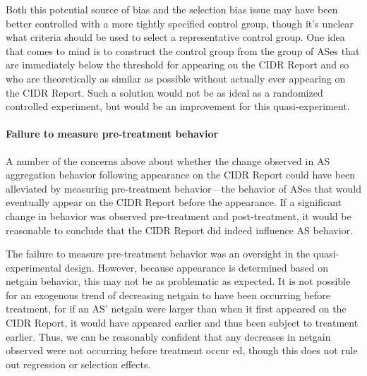 Both this potential source of bias and the selection bias issue may have been
better controlled with a more tightly specified control group, though it's
unclear what criteria should be used to select a representative control group.
One idea that comes to mind is to construct the control group from the group of
ASes that are immediately below the threshold for appearing on the CIDR Report
and so who are theoretically as similar as possible without actually ever
appearing on the CIDR Report. Such a solution would not be as ideal as a
randomized controlled experiment, but would be an improvement for this
quasi-experiment.


\paragraph{Failure to measure pre-treatment behavior}
A number of the concerns above about whether the change observed in AS
aggregation behavior following appearance on the CIDR Report could have been
alleviated by measuring pre-treatment behavior---the behavior of ASes that would
eventually appear on the CIDR Report before the appearance. If a significant
change in behavior was observed pre-treatment and post-treatment, it would be
reasonable to conclude that the CIDR Report did indeed influence AS behavior.

The failure to measure pre-treatment behavior was an oversight in the
quasi-experimental design. However, because appearance is determined based on
netgain behavior, this may not be as problematic as expected. It is not
possible for an exogenous trend of decreasing netgain to have been occurring
before treatment, for if an AS' netgain were larger than when it first appeared
on the CIDR Report, it would have appeared earlier and thus been subject to
treatment earlier. Thus, we can be reasonably confident that any decreases in
netgain observed were not occurring before treatment occur ed, though this
does not rule out regression or selection effects.

